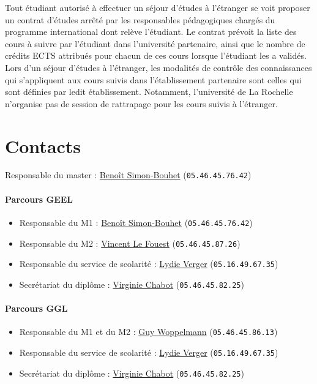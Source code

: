 \documentclass[a4paper,11pt]{article}
\begin{document}
Tout étudiant autorisé à effectuer un séjour d'études à l'étranger se voit proposer un contrat d'études arrêté par les responsables pédagogiques chargés du programme international dont relève l'étudiant. Le contrat prévoit la liste des cours à suivre par l'étudiant dans l'université partenaire, ainsi que le nombre de crédits ECTS attribués pour chacun de ces cours lorsque l'étudiant les a validés.
Lors d'un séjour d'études à l'étranger, les modalités de contrôle des connaissances qui s'appliquent aux cours suivis dans l'établissement partenaire sont celles qui sont définies par ledit établissement. Notamment, l'université de La Rochelle n'organise pas de session de rattrapage pour les cours suivis à l'étranger.

\newpage

\section{Contacts}\label{Contacts}

Responsable du master : \href{mailto:benoit.simon-bouhet@univ-lr.fr}{Benoît Simon-Bouhet} (\texttt{05.46.45.76.42})


\paragraph{Parcours GEEL}

\begin{itemize}
	\item Responsable du M1 : \href{mailto:benoit.simon-bouhet@univ-lr.fr}{Benoît Simon-Bouhet} (\texttt{05.46.45.76.42})
	\item Responsable du M2 : \href{mailto:vincent.le_fouest@univ-lr.fr}{Vincent Le Fouest} (\texttt{05.46.45.87.26})
	\item Responsable du service de scolarité : \href{mailto:lydie.verger@univ-lr.fr}{Lydie Verger} (\texttt{05.16.49.67.35})
	\item Secrétariat du diplôme : \href{mailto:virginie.chabot@univ-lr.fr}{Virginie Chabot} (\texttt{05.46.45.82.25})
\end{itemize}

\paragraph{Parcours GGL}

\begin{itemize}
	\item Responsable du M1 et du M2 : \href{mailto:guy.woppelmann@univ-lr.fr}{Guy Woppelmann} (\texttt{05.46.45.86.13})
	\item Responsable du service de scolarité : \href{mailto:lydie.verger@univ-lr.fr}{Lydie Verger} (\texttt{05.16.49.67.35})
	\item Secrétariat du diplôme : \href{mailto:virginie.chabot@univ-lr.fr}{Virginie Chabot} (\texttt{05.46.45.82.25})
\end{itemize}
\end{document}
